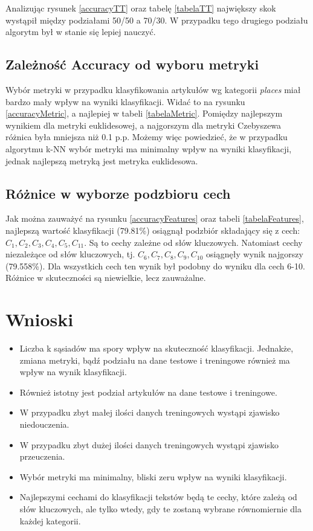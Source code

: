 \documentclass{classrep}
\begin{document}
Analizując rysunek \ref{accuracyTT} oraz tabelę \ref{tabelaTT} największy skok wystąpił między podziałami 50/50 a 70/30. W przypadku tego drugiego podziału algorytm był w stanie się lepiej nauczyć.
\subsection{Zależność Accuracy od wyboru metryki}
Wybór metryki w przypadku klasyfikowania artykułów wg kategorii \textsl{places} miał bardzo mały wpływ na wyniki klasyfikacji. Widać to na rysunku \ref{accuracyMetric}, a najlepiej w tabeli \ref{tabelaMetric}. Pomiędzy najlepszym wynikiem dla metryki euklidesowej, a najgorszym dla metryki Czebyszewa różnica była mniejsza niż 0.1 p.p. Możemy więc powiedzieć, że w przypadku algorytmu k-NN wybór metryki ma minimalny wpływ na wyniki klasyfikacji, jednak najlepszą metryką jest metryka euklidesowa.
\subsection{Różnice w wyborze podzbioru cech}
Jak można zauważyć na rysunku \ref{accuracyFeatures} oraz tabeli \ref{tabelaFeatures}, najlepszą wartość klasyfikacji (79.81\%) osiągnął podzbiór składający się z cech: $C_1, C_2, C_3, C_4, C_5, C_{11}$. Są to cechy zależne od słów kluczowych. Natomiast cechy niezależące od słów kluczowych, tj. $C_6, C_7, C_8, C_9, C_{10}$ osiągnęły wynik najgorszy (79.558\%). Dla wszystkich cech ten wynik był podobny do wyniku dla cech 6-10. Różnice w skuteczności są niewielkie, lecz zauważalne. 

\newpage
\section{Wnioski}
\begin{itemize}
	\item Liczba k sąsiadów ma spory wpływ na skuteczność klasyfikacji. Jednakże, zmiana metryki, bądź podziału na dane testowe i treningowe również ma wpływ na wynik klasyfikacji.
	\item Również istotny jest podział artykułów na dane testowe i treningowe. 
	\item W przypadku zbyt małej ilości danych treningowych wystąpi zjawisko niedouczenia.
	\item W przypadku zbyt dużej ilości danych treningowych wystąpi zjawisko przeuczenia.
	\item Wybór metryki ma minimalny, bliski zeru wpływ na wyniki klasyfikacji.
	\item Najlepszymi cechami do klasyfikacji tekstów będą te cechy, które zależą od słów kluczowych, ale tylko wtedy, gdy te zostaną wybrane równomiernie dla każdej kategorii.
\end{itemize}
\end{document}
